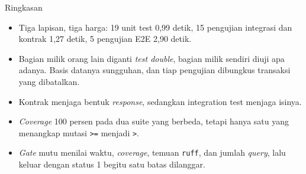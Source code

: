 \documentclass[aspectratio=169, table, 12pt]{beamer}
\begin{document}
\begin{frame}{{\Large Ringkasan}}
  \vspace{8pt}
  \begin{itemize}
    \item Tiga lapisan, tiga harga: 19 unit test 0,99 detik, 15 pengujian
          integrasi dan kontrak 1,27 detik, 5 pengujian E2E 2,90 detik.
    \item Bagian milik orang lain diganti \textit{test double}, bagian milik
          sendiri diuji apa adanya. Basis datanya sungguhan, dan tiap
          pengujian dibungkus transaksi yang dibatalkan.
    \item Kontrak menjaga bentuk \textit{response}, sedangkan integration
          test menjaga isinya.
    \item \textit{Coverage} 100 persen pada dua suite yang berbeda, tetapi
          hanya satu yang menangkap mutasi \texttt{>=} menjadi \texttt{>}.
    \item \textit{Gate} mutu menilai waktu, \textit{coverage}, temuan
          \texttt{ruff}, dan jumlah \textit{query}, lalu keluar dengan status
          1 begitu satu batas dilanggar.
  \end{itemize}
\end{frame}
\end{document}
